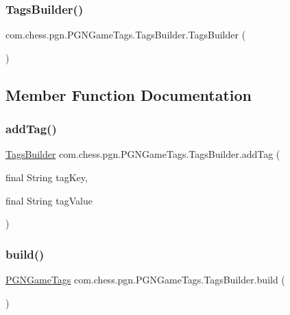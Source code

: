 \subsubsection{\texorpdfstring{TagsBuilder()}{TagsBuilder()}}
{\footnotesize\ttfamily com.\+chess.\+pgn.\+P\+G\+N\+Game\+Tags.\+Tags\+Builder.\+Tags\+Builder (\begin{DoxyParamCaption}{ }\end{DoxyParamCaption})}



\subsection{Member Function Documentation}
\mbox{\label{classcom_1_1chess_1_1pgn_1_1_p_g_n_game_tags_1_1_tags_builder_ad5ec9af32b02288d29839ebcb06fb0d6}} 
\subsubsection{\texorpdfstring{addTag()}{addTag()}}
{\footnotesize\ttfamily \mbox{\hyperlink{classcom_1_1chess_1_1pgn_1_1_p_g_n_game_tags_1_1_tags_builder}{Tags\+Builder}} com.\+chess.\+pgn.\+P\+G\+N\+Game\+Tags.\+Tags\+Builder.\+add\+Tag (\begin{DoxyParamCaption}\item[{final String}]{tag\+Key,  }\item[{final String}]{tag\+Value }\end{DoxyParamCaption})}

\mbox{\label{classcom_1_1chess_1_1pgn_1_1_p_g_n_game_tags_1_1_tags_builder_a5c58299a437c70c4a05ea3dda1abc2a5}} 
\subsubsection{\texorpdfstring{build()}{build()}}
{\footnotesize\ttfamily \mbox{\hyperlink{classcom_1_1chess_1_1pgn_1_1_p_g_n_game_tags}{P\+G\+N\+Game\+Tags}} com.\+chess.\+pgn.\+P\+G\+N\+Game\+Tags.\+Tags\+Builder.\+build (\begin{DoxyParamCaption}{ }\end{DoxyParamCaption})}



